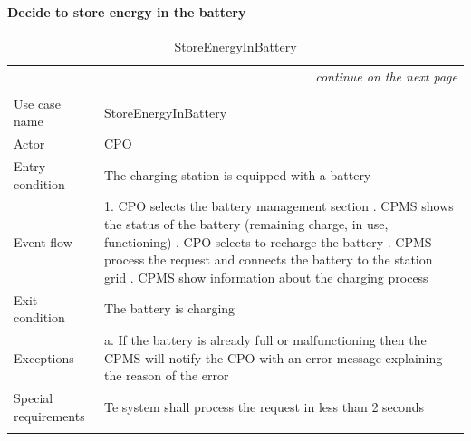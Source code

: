 \paragraph{Decide to store energy in the battery}
\begin{center}
    \begin{longtable}{p{4cm} p{11cm}}
    \multicolumn{2}{r}{\itshape{continue on the next page}}\\
    \endfoot 
    \\
    \endlastfoot
    \hline
     Use case name &  StoreEnergyInBattery\\
     \hline
     Actor & CPO \\
     \hline
     Entry condition & The charging station is equipped with a battery  \\
     \hline
     Event flow & 
        1. CPO selects the battery management section \newline
        2. CPMS shows the status of the battery (remaining charge, in use, functioning) \newline
        3. CPO selects to recharge the battery \newline
        4. CPMS process the request and connects the battery to the station grid \newline
        5. CPMS show information about the charging process
     \\
     \hline
     Exit condition & The battery is charging \\
     \hline
     Exceptions & 
        a. If the battery is already full or malfunctioning then the CPMS will notify the CPO with an error message explaining the reason of the error\\
     \hline
     Special requirements &
        Te system shall process the request in less than 2 seconds\\
     \hline
    \caption{StoreEnergyInBattery}
    \label{tab:StoreEnergyInBattery}
    \end{longtable}
\end{center}
\clearpage